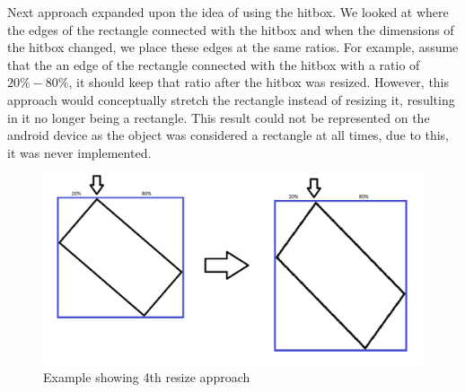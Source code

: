 Next approach expanded upon the idea of using the hitbox. 
We looked at where the edges of the rectangle connected with the hitbox and when the dimensions of the hitbox changed, we place these edges at the same ratios.
For example, assume that the an edge of the rectangle connected with the hitbox with a ratio of $20\% - 80\%$, it should keep that ratio after the hitbox was resized.
However, this approach would conceptually stretch the rectangle instead of resizing it, resulting in it no longer being a rectangle.
This result could not be represented on the android device as the object was considered a rectangle at all times, due to this, it was never implemented.
\begin{figure}
\includegraphics[scale=0.5]{media/approach4}
\caption{Example showing 4th resize approach}
\label{fig:app4}
\end{figure}

